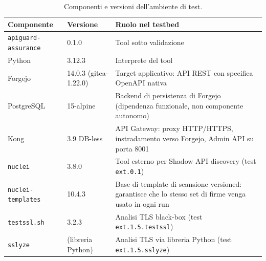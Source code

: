 \begin{table}[ht]
  \centering
  \small
  \begin{tabularx}{\textwidth}{@{} l l >{\raggedright\arraybackslash}X @{}}
    \toprule
    \textbf{Componente}         & \textbf{Versione}     & \textbf{Ruolo nel testbed}                                                                                  \\
    \midrule
    \texttt{apiguard-assurance} & 0.1.0                 & Tool sotto validazione                                                                                      \\
    \addlinespace
    Python                      & 3.12.3                & Interprete del tool                                                                                         \\
    \addlinespace
    Forgejo                     & 14.0.3 (gitea-1.22.0) & Target applicativo: \gls{API} REST con specifica OpenAPI nativa                                             \\
    \addlinespace
    PostgreSQL                  & 15-alpine             & Backend di persistenza di Forgejo (dipendenza funzionale, non componente autonomo)                          \\
    \addlinespace
    Kong                        & 3.9 DB-less           & \gls{API} Gateway: proxy \gls{HTTP}/\gls{HTTPS}, instradamento verso Forgejo, Admin \gls{API} su porta 8001 \\
    \addlinespace
    \texttt{nuclei}             & 3.8.0                 & Tool esterno per Shadow \gls{API} discovery (test \texttt{ext.0.1})                                         \\
    \addlinespace
    \texttt{nuclei-templates}   & 10.4.3                & Base di template di scansione versioned: garantisce che lo stesso set di firme venga usato in ogni run      \\
    \addlinespace
    \texttt{testssl.sh}         & 3.2.3                 & Analisi \gls{TLS} black-box (test \texttt{ext.1.5.testssl})                                                 \\
    \addlinespace
    \texttt{sslyze}             & (libreria Python)     & Analisi \gls{TLS} via libreria Python (test \texttt{ext.1.5.sslyze})                                        \\
    \bottomrule
  \end{tabularx}
  \caption{Componenti e versioni dell'ambiente di test.}
  \label{tab:versioni-testbed}
\end{table}